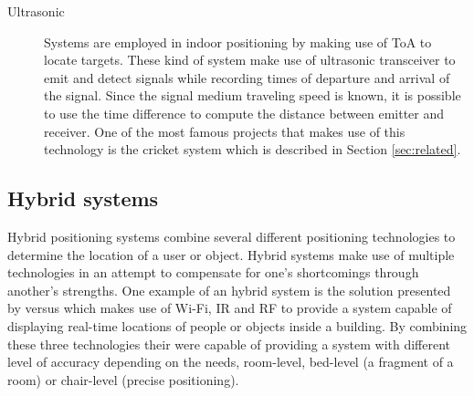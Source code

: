 \begin{description}
  
  
\item [Ultrasonic ]  Systems are employed in indoor positioning by making use of \ac{ToA} to locate targets\cite{survey3}. These kind of system make use of ultrasonic transceiver to emit and detect signals while recording times of departure and arrival of the signal. Since the signal medium traveling speed is known, it is possible to use the time difference to compute the distance between emitter and receiver.  One of the most famous projects that makes use of this technology is the cricket system which is described in Section \ref{sec:related}.  
  
  
\end{description}  
  
  
\subsection{Hybrid systems}  
\label{subsec:hybrid}  
   
Hybrid positioning systems combine several different positioning technologies to determine the location of a user or object. Hybrid systems make use of multiple technologies in an attempt to compensate for one's shortcomings through another's strengths. One example of an hybrid system is the solution presented by versus \cite{versus} which makes use of Wi-Fi, IR and RF to provide a system capable of displaying real-time locations of people or objects inside a building. By combining these three technologies their were capable of providing a system with different level of accuracy depending on the needs, room-level, bed-level (a fragment of a room) or chair-level (precise positioning).   
  
  
  
 